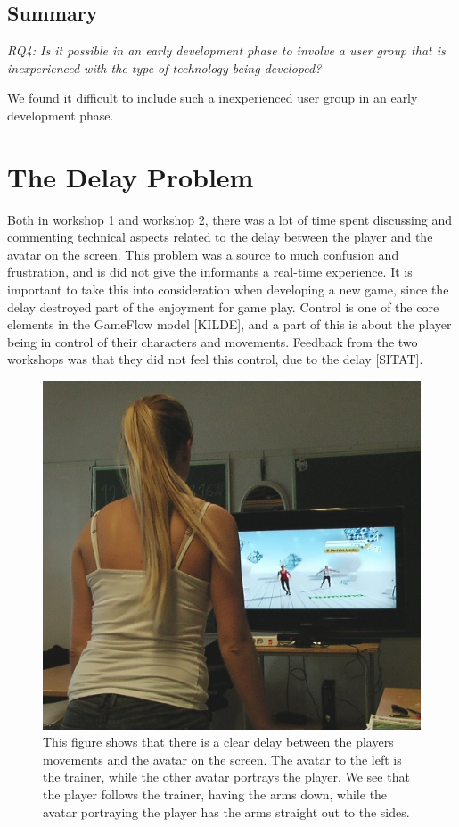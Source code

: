 \subsection{Summary}
\emph{RQ4: Is it possible in an early development phase to involve a user group that is inexperienced with the type of technology being developed?}

We found it difficult to include such a inexperienced user group in an early development phase. 

\section{The Delay Problem}
\label{sec:delay}
Both in workshop 1 and workshop 2, there was a lot of time spent discussing and commenting technical aspects related to the delay between the player and the avatar on the screen. This problem was a source to much confusion and frustration, and is did not give the informants a real-time experience. It is important to take this into consideration when developing a new game, since the delay destroyed part of the enjoyment for game play. Control is one of the core elements in the GameFlow model [KILDE], and a part of this is about the player being in control of their characters and movements. Feedback from the two workshops was that they did not feel this control, due to the delay [SITAT].  


\begin{figure} [H]
\centering
\includegraphics[scale=0.7]{kineDelay.jpg}
\caption[The Kinect sensor delay]{This figure shows that there is a clear delay between the players movements and the avatar on the screen. The avatar to the left is the trainer, while the other avatar portrays the player. We see that the player follows the trainer, having the arms down, while the avatar portraying the player has the arms straight out to the sides.}
\label{pickingapples}
\end{figure}

